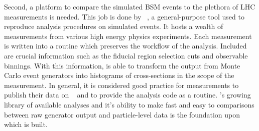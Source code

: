 Second, a platform to compare the simulated BSM events to the plethora of LHC measurements is needed. This job is done by \rivet~\cite{rivet}, a general-purpose tool used to reproduce analysis procedures on simulated events. It hosts a wealth of measurements from various high energy physics experiments. Each measurement is written into a \rivet routine which preserves the workflow of the analysis. Included are crucial information such as the fiducial region selection cuts and observable binnings. With this information, \rivet is able to transform the output from Monte Carlo event generators into histograms of cross-sections in the scope of the measurement. In general, it is considered good practice for \LHC measurements to publish their data on \HEPData~\cite{HEPData} and to provide the analysis code as a \rivet routine. \rivet's growing library of available analyses and it's ability to make fast and easy to comparisons between raw generator output and particle-level data is the foundation upon which \contur is built. 

